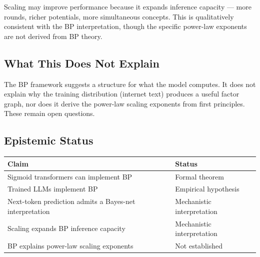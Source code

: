 Scaling may improve performance because it expands inference capacity ---
more rounds, richer potentials, more simultaneous concepts. This is
qualitatively consistent with the BP interpretation, though the specific
power-law exponents are not derived from BP theory.

\subsection*{What This Does Not Explain}

The BP framework suggests a structure for what the model computes. It does
not explain why the training distribution (internet text) produces a useful
factor graph, nor does it derive the power-law scaling exponents from first
principles. These remain open questions.

\subsection*{Epistemic Status}

\begin{center}
\begin{tabular}{ll}
\toprule
Claim & Status \\
\midrule
Sigmoid transformers can implement BP & Formal theorem \\
Trained LLMs implement BP & Empirical hypothesis \\
Next-token prediction admits a Bayes-net interpretation & Mechanistic interpretation \\
Scaling expands BP inference capacity & Mechanistic interpretation \\
BP explains power-law scaling exponents & Not established \\
\bottomrule
\end{tabular}
\end{center}